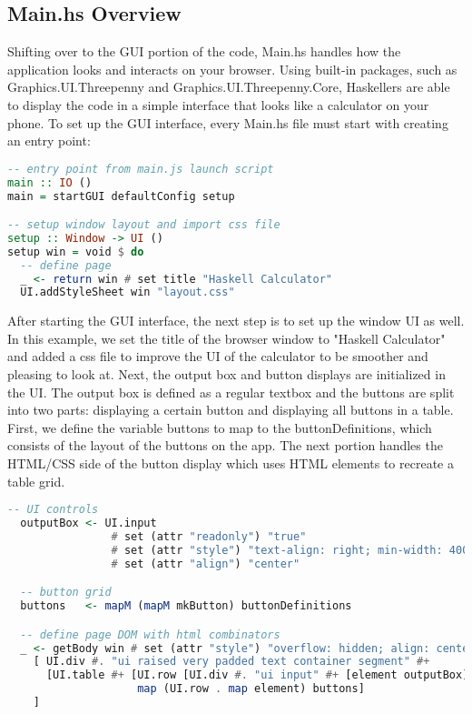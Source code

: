 \documentclass{article}
\begin{document}
\subsection{Main.hs Overview}
Shifting over to the GUI portion of the code, Main.hs handles how the application looks and interacts on your browser. Using built-in packages, such as Graphics.UI.Threepenny and Graphics.UI.Threepenny.Core, Haskellers are able to display the code in a simple interface that looks like a calculator on your phone. To set up the GUI interface, every Main.hs file must start with creating an entry point:

\begin{lstlisting}[language=Haskell]
-- entry point from main.js launch script
main :: IO ()
main = startGUI defaultConfig setup

-- setup window layout and import css file
setup :: Window -> UI ()
setup win = void $ do
  -- define page
  _ <- return win # set title "Haskell Calculator"
  UI.addStyleSheet win "layout.css"
\end{lstlisting}

\noindent
After starting the GUI interface, the next step is to set up the window UI as well. In this example, we set the title of the browser window to "Haskell Calculator" and added a css file to improve the UI of the calculator to be smoother and pleasing to look at. Next, the output box and button displays are initialized in the UI. The output box is defined as a regular textbox and the buttons are split into two parts: displaying a certain button and displaying all buttons in a table. First, we define the variable buttons to map to the buttonDefinitions, which consists of the layout of the buttons on the app. The next portion handles the HTML/CSS side of the button display which uses HTML elements to recreate a table grid.

\begin{lstlisting}[language=Haskell]
-- UI controls
  outputBox <- UI.input
                # set (attr "readonly") "true"
                # set (attr "style") "text-align: right; min-width: 400px; min-height: 40px; font-size:24px"
                # set (attr "align") "center"

  -- button grid
  buttons   <- mapM (mapM mkButton) buttonDefinitions

  -- define page DOM with html combinators
  _ <- getBody win # set (attr "style") "overflow: hidden; align: center" #+
    [ UI.div #. "ui raised very padded text container segment" #+
      [UI.table #+ [UI.row [UI.div #. "ui input" #+ [element outputBox]]] #+ 
                    map (UI.row . map element) buttons]
    ]
\end{lstlisting}
\end{document}
